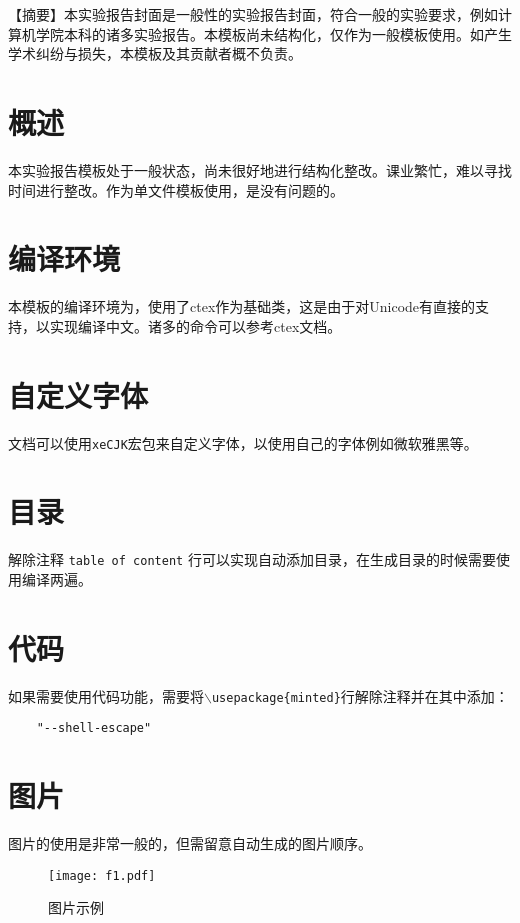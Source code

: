 \documentclass[10.5pt,a4paper,headings]{ctexart}
\begin{document}

\onehalfspacing
【摘要】本实验报告封面是一般性的实验报告封面，符合一般的实验要求，例如计算机学院本科的诸多实验报告。本模板尚未结构化，仅作为一般模板使用。如产生学术纠纷与损失，本模板及其贡献者概不负责。

\doublespacing
\section{概述}
本实验报告模板处于一般状态，尚未很好地进行结构化整改。课业繁忙，难以寻找时间进行整改。作为单文件模板使用，是没有问题的。

\section{编译环境}
本模板的编译环境为\XeLaTeX ，使用了ctex作为基础类，这是由于\XeLaTeX 对Unicode有直接的支持，以实现编译中文。诸多的命令可以参考ctex文档。

\section{自定义字体}
文档可以使用\texttt{xeCJK}宏包来自定义字体，以使用自己的字体例如微软雅黑等。

\section{目录}
解除注释 \texttt{table of content} 行可以实现自动添加目录，在生成目录的时候需要使用\XeLaTeX 编译两遍。

\section{代码}
如果需要使用代码功能，需要将\texttt{$\backslash$usepackage\{minted\}}行解除注释并在其中添加：
\begin{verbatim}
    "--shell-escape"
\end{verbatim}

\section{图片}
图片的使用是非常一般的，但需留意自动生成的图片顺序。
\begin{figure}[htbp]
    \centering
    \texttt{[image: f1.pdf]}
    \caption{图片示例}
\end{figure}
\end{document}
